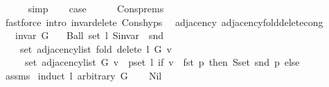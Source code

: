 \begin{isabellebody}
\ \ \ \ \isamarkupfalse%
\ simp{\isacharplus}{\kern0pt}\isanewline
\ \ \isamarkupfalse%
\ {\isacharquery}{\kern0pt}case\isanewline
\ \ \ \ \isamarkupfalse%
\ Cons{\isachardot}{\kern0pt}prems{\isacharparenleft}{\kern0pt}{}{\isacharparenright}{\kern0pt}\isanewline
\ \ \ \ \isamarkupfalse%
\ {\isacharparenleft}{\kern0pt}fastforce\ intro{\isacharcolon}{\kern0pt}\ invar{\isacharunderscore}{\kern0pt}delete{\isacharunderscore}{\kern0pt}{}\ Cons{\isachardot}{\kern0pt}hyps{\isacharparenright}{\kern0pt}\isanewline
{}\isamarkupfalse%
%
\endisatagproof
{\isafoldproof}%
%
\isadelimproof
\isanewline
%
\endisadelimproof
\isanewline
{}\isamarkupfalse%
\ {\isacharparenleft}{\kern0pt}\ adjacency{\isacharparenright}{\kern0pt}\ adjacency{\isacharunderscore}{\kern0pt}fold{\isacharunderscore}{\kern0pt}delete{\isacharunderscore}{\kern0pt}{}{\isacharunderscore}{\kern0pt}cong{\isacharcolon}{\kern0pt}\isanewline
\ \ \ {\isachardoublequoteopen}invar\ G{\isachardoublequoteclose}\isanewline
\ \ \ {\isachardoublequoteopen}Ball\ {\isacharparenleft}{\kern0pt}set\ l{\isacharparenright}{\kern0pt}\ {\isacharparenleft}{\kern0pt}S{\isachardot}{\kern0pt}invar\ {\isasymcirc}\ snd{\isacharparenright}{\kern0pt}{\isachardoublequoteclose}\isanewline
\ \ \isanewline
\ \ \ \ {\isachardoublequoteopen}set\ {\isacharparenleft}{\kern0pt}adjacency{\isacharunderscore}{\kern0pt}list\ {\isacharparenleft}{\kern0pt}fold\ delete{\isacharunderscore}{\kern0pt}{}\ l\ G{\isacharparenright}{\kern0pt}\ v{\isacharparenright}{\kern0pt}\ {\isacharequal}{\kern0pt}\isanewline
\ \ \ \ \ set\ {\isacharparenleft}{\kern0pt}adjacency{\isacharunderscore}{\kern0pt}list\ G\ v{\isacharparenright}{\kern0pt}\ {\isacharminus}{\kern0pt}\ {\isacharparenleft}{\kern0pt}{\isasymUnion}p{\isasymin}set\ l{\isachardot}{\kern0pt}\ if\ v\ {\isacharequal}{\kern0pt}\ fst\ p\ then\ S{\isachardot}{\kern0pt}set\ {\isacharparenleft}{\kern0pt}snd\ p{\isacharparenright}{\kern0pt}\ else\ {\isacharbraceleft}{\kern0pt}{\isacharbraceright}{\kern0pt}{\isacharparenright}{\kern0pt}{\isachardoublequoteclose}\isanewline
%
\isadelimproof
\ \ %
\endisadelimproof
%
\isatagproof
{}\isamarkupfalse%
\ assms\isanewline
{}\isamarkupfalse%
\ {\isacharparenleft}{\kern0pt}induct\ l\ arbitrary{\isacharcolon}{\kern0pt}\ G{\isacharparenright}{\kern0pt}\isanewline
\ \ \isamarkupfalse%
\ Nil\isanewline
\ \ \isamarkupfalse%

\end{isabellebody}
